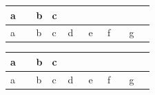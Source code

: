 \begin{tabular}{l|>{\centering}p{0.11\linewidth}||>{\centering}p{0.11\linewidth}||>{\centering}p{0.11\linewidth}|c}
a & b & c \tabularnewline
\hline
a & b & c & d & e & f & g \tabularnewline
\end{tabular}
\begin{longtable}{l|>{\centering}p{0.11\linewidth}||>{\centering}p{0.11\linewidth}||>{\centering}p{0.11\linewidth}|c}
a & b & c \tabularnewline
\hline
a & b & c & d & e & f & g \tabularnewline
\end{longtable}
